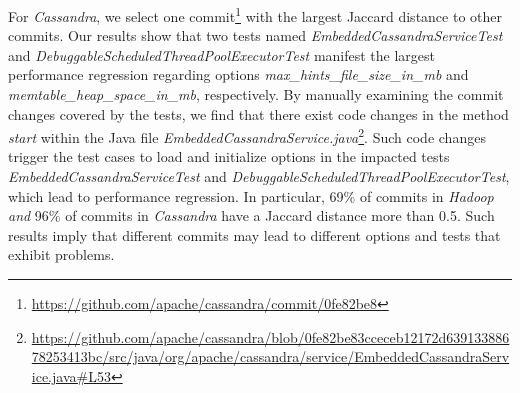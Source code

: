 For \emph{Cassandra}, we select one commit\footnote{\url{https://github.com/apache/cassandra/commit/0fe82be8}} with the largest Jaccard distance to other commits. Our results show that two tests named \emph{EmbeddedCassandraServiceTest} and \emph{DebuggableScheduledThreadPoolExecutorTest} manifest the largest performance regression regarding options \emph{max\_hints\_file\_size\_in\_mb} and \emph{memtable\_heap\_space\_in\_mb}, respectively. By manually examining the commit changes covered by the tests, we find that there exist code changes in the method \emph{start} within the Java file \emph{EmbeddedCassandraService.java}\footnote{\url{https://github.com/apache/cassandra/blob/0fe82be83cceceb12172d63913388678253413bc/src/java/org/apache/cassandra/service/EmbeddedCassandraService.java\#L53}}. %
Such code changes trigger the test cases to load and initialize options in the impacted tests \emph{EmbeddedCassandraServiceTest} and \emph{DebuggableScheduledThreadPoolExecutorTest}, which lead to performance regression. %
In particular, 69\% of commits in \emph{Hadoop and }96\% of commits in \emph{Cassandra} have a Jaccard distance more than 0.5. Such results imply that different commits may lead to different options and tests that exhibit \inconsistent problems. %






